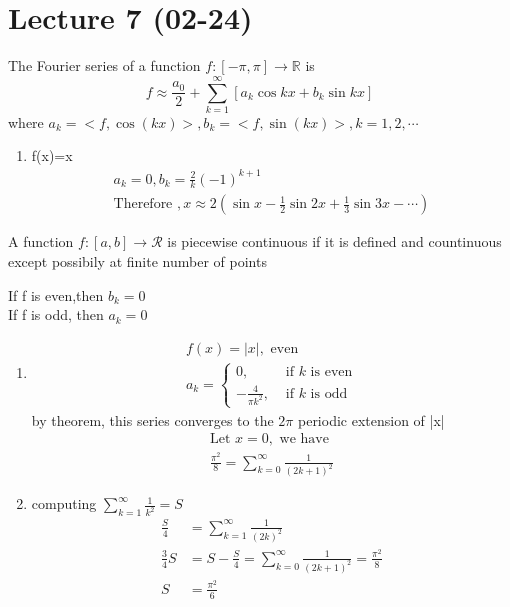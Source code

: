 \section{Lecture 7 (02-24)}
\begin{definition}[]{}
The Fourier series of a function $ f:[-\pi,\pi]\rightarrow\mathbb{R} $ is
$$
    f\approx \frac{a_0}{2}+\sum_{k=1}^{\infty}[a_k\cos{kx}+b_k\sin{kx}]
$$ where $ a_k=<f,\cos(kx)>,b_k=<f,\sin(kx)>,k=1,2,\cdots $ 
\end{definition}
\begin{example}[]{}
 \begin{enumerate}[label=\circled{\arabic*}] 
 \item f(x)=x
 \begin{align*}{}{}
 a_k=0,b_k=\frac{2}{k}(-1)^{k+1}\\
 \text{Therefore },x\approx 2(\sin{x}-\frac{1}{2}\sin{2x}+\frac{1}{3}\sin{3x}-\cdots)
 \end{align*}
 \end{enumerate}
\end{example}
\begin{definition}{}
A function $ f:[a,b]\rightarrow\mathcal{R} $ is piecewise continuous if it is defined and countinuous except possibily at finite number of points 
\end{definition}
\begin{proposition}{}
If f is even,then $ b_k=0 $ 
\\If f is odd, then $ a_k=0 $ 
\end{proposition}
\begin{example}[]{}
 \begin{enumerate}[label=\circled{\arabic*}] 
 \item \begin{align*}{}{}
 f(x)=|x|,\text{ even }\\
 a_k=\begin{cases}
    0, & \text{ if } k \text{ is even}\\
    -\frac{4}{\pi k^2}, & \text{ if } k \text{ is odd}
 \end{cases}
 \end{align*}
 by theorem, this series converges to the $ 2\pi $ periodic extension of |x|
 \begin{align*}{}{}
 \text{Let }x=0,\text{ we have}\\
 \frac{\pi^2}{8}=\sum_{k=0}^{\infty}\frac{1}{(2k+1)^2}
 \end{align*} 
 \item computing $ \sum_{k=1}^{\infty}\frac{1}{k^2}=S $
 \begin{align*}{}{}
 \frac{S}{4}&=\sum_{k=1}^{\infty}\frac{1}{(2k)^2}\\
 \frac{3}{4}S&=S-\frac{S}{4}=\sum_{k=0}^{\infty}\frac{1}{(2k+1)^2}=\frac{\pi^2}{8}\\
    S&=\frac{\pi^2}{6}
 \end{align*} 
 \end{enumerate}
\end{example}
